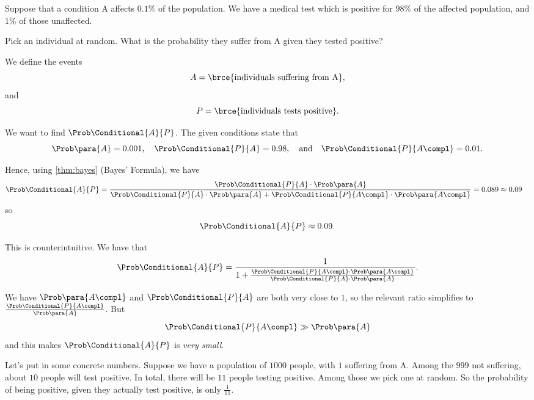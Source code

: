 \begin{example}
    \label{ex:false-positives}%
    Suppose that a condition A affects \(0.1\%\) of the population. We have a medical test which is positive for \(98\%\) of the affected population, and \(1\%\) of those unaffected.

    Pick an individual at random. What is the probability they suffer from A given they tested positive?

    We define the events
    \[
        A = \brce{\text{individuals suffering from A}},
    \]
    and
    \[
        P = \brce{\text{individuals tests positive}}.
    \]

    We want to find \(\Prob\Conditional{A}{P}\). The given conditions state that
    \[
        \Prob\para{A} = 0.001, \quad \Prob\Conditional{P}{A} = 0.98, \quad \text{and} \quad \Prob\Conditional{P}{A\compl} = 0.01.
    \]

    Hence, using \autoref{thm:bayes} (Bayes' Formula), we have
    \begin{align*}
        \Prob\Conditional{A}{P} &= \frac{\Prob\Conditional{P}{A} \cdot \Prob\para{A}}{\Prob\Conditional{P}{A} \cdot \Prob\para{A} + \Prob\Conditional{P}{A\compl} \cdot \Prob\para{A\compl}} = 0.089 \approx 0.09
    \end{align*}
    so
    \[
        \Prob\Conditional{A}{P} \approx 0.09.
    \]

    This is counterintuitive. We have that
    \[
        \Prob\Conditional{A}{P} = \frac{1}{1 + \frac{\Prob\Conditional{P}{A\compl} \cdot \Prob\para{A\compl}}{\Prob\Conditional{P}{A} \cdot \Prob\para{A}}}.
    \]

    We have \(\Prob\para{A\compl}\) and \(\Prob\Conditional{P}{A}\) are both very close to \(1\), so the relevant ratio simplifies to \(\frac{\Prob\Conditional{P}{A\compl}}{\Prob\para{A}}\). But
    \[
        \Prob\Conditional{P}{A\compl} \gg \Prob\para{A}
    \]
    and this makes \(\Prob\Conditional{A}{P}\) is \emph{very small}.

    Let's put in some concrete numbers. Suppose we have a population of \(1000\) people, with \(1\) suffering from A. Among the \(999\) not suffering, about \(10\) people will test positive. In total, there will be \(11\) people testing positive. Among those we pick one at random. So the probability of being positive, given they actually test positive, is only \(\frac{1}{11}\).
\end{example}

